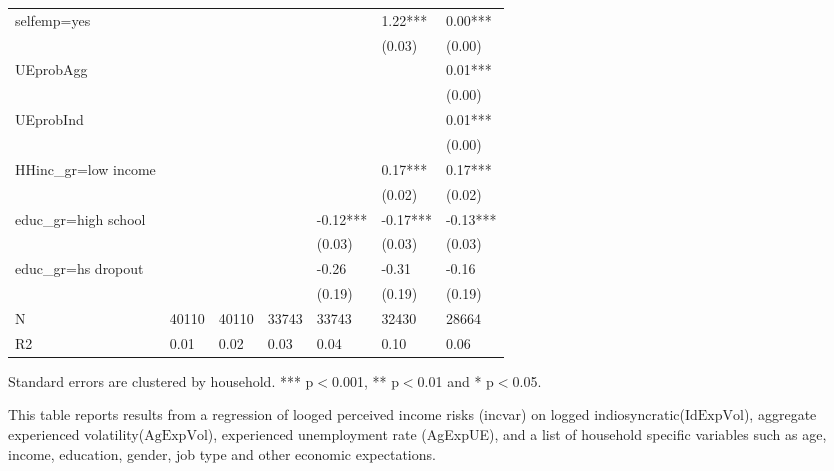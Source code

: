 \begin{table}[p]
\begin{adjustbox}{width=\textwidth}
\begin{threeparttable}
\begin{tabular}{lllllll}
selfemp=yes         &           &           &            &             &      1.22*** &       0.00*** \\
                    &           &           &            &             &       (0.03) &        (0.00) \\
UEprobAgg           &           &           &            &             &              &       0.01*** \\
                    &           &           &            &             &              &        (0.00) \\
UEprobInd           &           &           &            &             &              &       0.01*** \\
                    &           &           &            &             &              &        (0.00) \\
HHinc\_gr=low income &           &           &            &             &      0.17*** &       0.17*** \\
                    &           &           &            &             &       (0.02) &        (0.02) \\
educ\_gr=high school &           &           &            &    -0.12*** &     -0.17*** &      -0.13*** \\
                    &           &           &            &      (0.03) &       (0.03) &        (0.03) \\
educ\_gr=hs dropout  &           &           &            &       -0.26 &        -0.31 &         -0.16 \\
                    &           &           &            &      (0.19) &       (0.19) &        (0.19) \\
N                   &     40110 &     40110 &      33743 &       33743 &        32430 &         28664 \\
R2                  &      0.01 &      0.02 &       0.03 &        0.04 &         0.10 &          0.06 \\
\bottomrule
\end{tabular}
\begin{tablenotes}\item Standard errors are clustered by household. *** p$<$0.001, ** p$<$0.01 and * p$<$0.05. 
\item This table reports results from a regression of looged perceived income risks (incvar) on logged indiosyncratic($\text{IdExpVol}$), aggregate experienced volatility($\text{AgExpVol}$), experienced unemployment rate (AgExpUE), and a list of household specific variables such as age, income, education, gender, job type and other economic expectations.
\end{tablenotes}
\end{threeparttable}
\end{adjustbox}
\end{table}